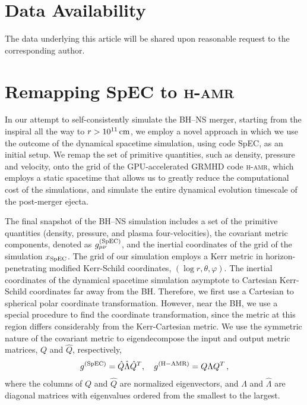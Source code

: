 \documentclass[twocolumn,dvipsnames]{aastex62}
\begin{document}
\section*{Data Availability}

The data underlying this article will be shared upon reasonable request to the corresponding author.



\appendix

\section{Remapping SpEC to \textsc{h-amr}} \label{sec:remap}

In our attempt to self-consistently simulate the BH--NS merger, starting from the inspiral all the way to $ r > 10^{11}\,{\rm cm} $, we employ a novel approach in which we use the outcome of the dynamical spacetime simulation, using code SpEC, as an initial setup. We remap the set of primitive quantities, such as density, pressure and velocity, onto the grid of the GPU-accelerated GRMHD code \textsc{h-amr}, which employs a static spacetime that allows us to greatly reduce the computational cost of the simulations, and simulate the entire dynamical evolution timescale of the post-merger ejecta.

The final snapshot of the BH--NS simulation includes a set of the primitive quantities (density, pressure, and plasma four-velocities), the covariant metric components, denoted as $g_{\mu\nu}^{\rm(SpEC)}$, and the inertial coordinates of the grid of the simulation $x_{\rm SpEC}$. The grid of our simulation employs a Kerr metric in horizon-penetrating modified Kerr-Schild coordinates, $(\log r, \theta, \varphi)$. The inertial coordinates of the dynamical spacetime simulation asymptote to Cartesian Kerr-Schild coordinates far away from the BH. Therefore, we first use a Cartesian to spherical polar coordinate transformation. However, near the BH, we use a special procedure to find the coordinate transformation, since the metric at this region differs considerably from the Kerr-Cartesian metric.
We use the symmetric nature of the covariant metric to eigendecompose the input and output metric matrices, $Q$ and $\hat{Q}$, respectively,
\begin{equation}
    g^{\rm (SpEC)} = \hat{Q}\hat{\Lambda}\hat{Q}^T, \quad g^{\rm (H-AMR)} = Q\Lambda Q^T\,,
    \label{eqn:symm_matrix}
\end{equation}
where the columns of $Q$ and $\hat{Q}$ are normalized eigenvectors, and $\Lambda$ and $\hat{\Lambda}$ are diagonal matrices with eigenvalues ordered from the smallest to the largest.
\end{document}
